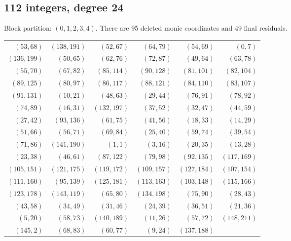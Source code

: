 \documentclass[10pt,letterpaper]{article}
\theoremstyle{remark}\newtheorem{remark}[theorem]{Remark}
\begin{document}
\subsection{112 integers, degree 24}
Block partition: $(0,1,2,3,4)$.
There are 95 deleted monic coordinates and 49 final residuals.
\begin{center}\small\begin{tabular}{rrrrrr}\toprule
$(53,68)$ & $(138,191)$ & $(52,67)$ & $(64,79)$ & $(54,69)$ & $(0,7)$\\
$(136,199)$ & $(50,65)$ & $(62,76)$ & $(72,87)$ & $(49,64)$ & $(63,78)$\\
$(55,70)$ & $(67,82)$ & $(85,114)$ & $(90,128)$ & $(81,101)$ & $(82,104)$\\
$(89,125)$ & $(80,97)$ & $(86,117)$ & $(88,121)$ & $(84,110)$ & $(83,107)$\\
$(91,131)$ & $(10,21)$ & $(48,63)$ & $(29,44)$ & $(76,91)$ & $(78,92)$\\
$(74,89)$ & $(16,31)$ & $(132,197)$ & $(37,52)$ & $(32,47)$ & $(44,59)$\\
$(27,42)$ & $(93,136)$ & $(61,75)$ & $(41,56)$ & $(18,33)$ & $(14,29)$\\
$(51,66)$ & $(56,71)$ & $(69,84)$ & $(25,40)$ & $(59,74)$ & $(39,54)$\\
$(71,86)$ & $(141,190)$ & $(1,1)$ & $(3,16)$ & $(20,35)$ & $(13,28)$\\
$(23,38)$ & $(46,61)$ & $(87,122)$ & $(79,98)$ & $(92,135)$ & $(117,169)$\\
$(105,151)$ & $(121,175)$ & $(119,172)$ & $(109,157)$ & $(127,184)$ & $(107,154)$\\
$(111,160)$ & $(95,139)$ & $(125,181)$ & $(113,163)$ & $(103,148)$ & $(115,166)$\\
$(123,178)$ & $(143,119)$ & $(65,80)$ & $(134,198)$ & $(75,90)$ & $(28,43)$\\
$(43,58)$ & $(34,49)$ & $(31,46)$ & $(24,39)$ & $(36,51)$ & $(21,36)$\\
$(5,20)$ & $(58,73)$ & $(140,189)$ & $(11,26)$ & $(57,72)$ & $(148,211)$\\
$(145,2)$ & $(68,83)$ & $(60,77)$ & $(9,24)$ & $(137,188)$ & \\
\bottomrule\end{tabular}\end{center}
\end{document}
